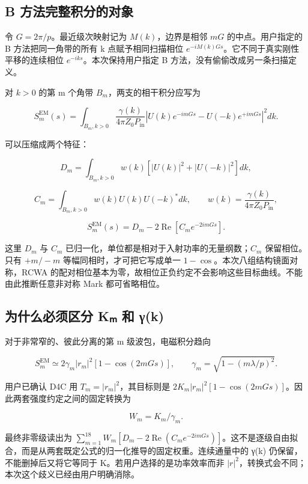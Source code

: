 \documentclass[
  chinese,
  UTF8,
  a4paper,
  11pt]{ctexart}
\begin{document}
\subsection{B
方法完整积分的对象}\label{b-ux65b9ux6cd5ux5b8cux6574ux79efux5206ux7684ux5bf9ux8c61}

令 \(G=2\pi/p\)。最近级次映射记为 \(M(k)\)，边界是相邻 \(mG\)
的中点。用户指定的 B 方法把同一角带的所有 k 点赋予相同扫描相位
\(e^{-iM(k)Gs}\)。它不同于真实刚性平移的连续相位
\(e^{-iks}\)。本次保持用户指定 B 方法，没有偷偷改成另一条扫描定义。

对 \(k>0\) 的第 m 个角带 \(B_m\)，两支的相干积分应写为

\[S_{m}^{\mathrm{EM}}(s)=\int_{B_m,k>0}\frac{\gamma(k)}{4\pi Z_0P_{\mathrm{in}}}
\left|U(k)e^{-imGs}-U(-k)e^{+imGs}\right|^2dk.\]

可以压缩成两个特征：

\[D_m=\int_{B_m,k>0}w(k)[|U(k)|^2+|U(-k)|^2]dk,\]

\[C_m=\int_{B_m,k>0}w(k)U(k)U(-k)^*dk,\qquad w(k)=\frac{\gamma(k)}{4\pi Z_0P_{\mathrm{in}}},\]

\[S_m^{\mathrm{EM}}(s)=D_m-2\operatorname{Re}[C_m e^{-2imGs}].\]

这里 \(D_m\) 与 \(C_m\)
已归一化，单位都是相对于入射功率的无量纲数；\(C_m\) 保留相位。只有
\(+m/-m\) 等幅同相时，才可把它写成单一
\(1-\cos\)。本次八组结构镜面对称，RCWA
的配对相位基本为零，故相位正负约定不会影响这些目标曲线。不能由此推断任意非对称
Mark 都可省略相位。

\subsection{为什么必须区分 Kₘ 和
γ(k)}\label{ux4e3aux4ec0ux4e48ux5fc5ux987bux533aux5206-kux2098-ux548c-ux3b3k}

对于非常窄的、彼此分离的第 m 级波包，电磁积分趋向

\[S_m^{\mathrm{EM}}\simeq2\gamma_m|r_m|^2[1-\cos(2mGs)],\qquad\gamma_m=\sqrt{1-(m\lambda/p)^2}.\]

用户已确认 D4C 用 \(T_m=|r_m|^2\)，其目标则是
\(2K_m|r_m|^2[1-\cos(2mGs)]\)。因此两套强度约定之间的固定转换为

\[\boxed{W_m=K_m/\gamma_m.}\]

最终非零级读出为
\(\sum_{m=1}^{18}W_m[D_m-2\operatorname{Re}(C_m e^{-2imGs})]\)。这不是逐级自由拟合，而是从两套既定公式的归一化推导的固定权重。连续通量中的
γ(k) 仍保留，不能删掉后又将它等同于 K。若用户选择的是功率效率而非
\(|r|^2\)，转换式会不同；本次这个歧义已经由用户明确消除。
\end{document}
